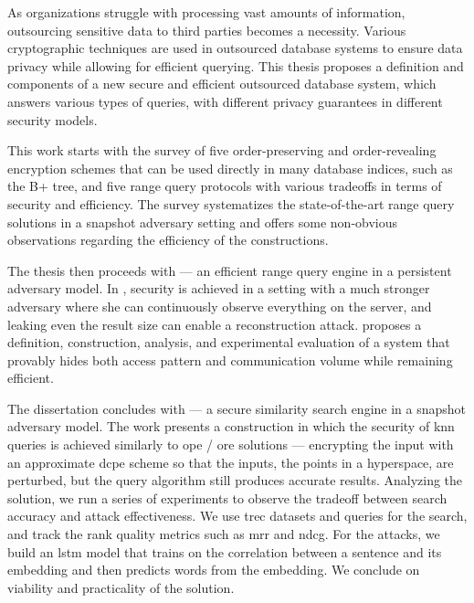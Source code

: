 As organizations struggle with processing vast amounts of information, outsourcing sensitive data to third parties becomes a necessity.
Various cryptographic techniques are used in outsourced database systems to ensure data privacy while allowing for efficient querying.
This thesis proposes a definition and components of a new secure and efficient outsourced database system, which answers various types of queries, with different privacy guarantees in different security models.

This work starts with the survey of five order-preserving and order-revealing encryption schemes that can be used directly in many database indices, such as the B+ tree, and five range query protocols with various tradeoffs in terms of security and efficiency.
The survey systematizes the state-of-the-art range query solutions in a snapshot adversary setting and offers some non-obvious observations regarding the efficiency of the constructions.

The thesis then proceeds with \epsolute{} --- an efficient range query engine in a persistent adversary model.
In \epsolute{}, security is achieved in a setting with a much stronger adversary where she can continuously observe everything on the server, and leaking even the result size can enable a reconstruction attack.
\epsolute{} proposes a definition, construction, analysis, and experimental evaluation of a system that provably hides both access pattern and communication volume while remaining efficient.

The dissertation concludes with \kanon{} --- a secure similarity search engine in a snapshot adversary model.
The work presents a construction in which the security of \acrshort{knn} queries is achieved similarly to \acrshort{ope} / \acrshort{ore} solutions --- encrypting the input with an approximate \acrlong{dcpe} scheme so that the inputs, the points in a hyperspace, are perturbed, but the query algorithm still produces accurate results.
Analyzing the solution, we run a series of experiments to observe the tradeoff between search accuracy and attack effectiveness.
We use \acrshort{trec} datasets and queries for the search, and track the rank quality metrics such as \acrshort{mrr} and \acrshort{ndcg}.
For the attacks, we build an \acrshort{lstm} model that trains on the correlation between a sentence and its embedding and then predicts words from the embedding.
We conclude on viability and practicality of the solution.
